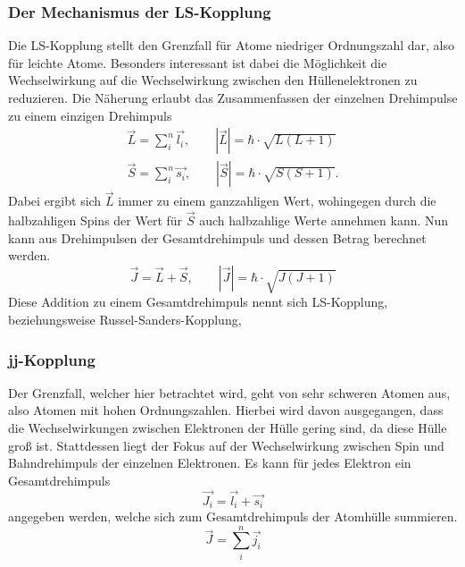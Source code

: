 \subsubsection{Der Mechanismus der LS-Kopplung}
Die LS-Kopplung stellt den Grenzfall für Atome niedriger Ordnungszahl dar, also für leichte Atome. Besonders interessant ist dabei die Möglichkeit die Wechselwirkung auf die Wechselwirkung zwischen den Hüllenelektronen zu reduzieren. Die Näherung erlaubt das Zusammenfassen der einzelnen Drehimpulse zu einem einzigen Drehimpuls
\begin{align}
    \vec{L}=\sum \limits_{i}^n \vec{l_i},\qquad |\vec{L}|=\hbar \cdot \sqrt{L(L+1)}\\
    \vec{S}=\sum \limits_{i}^n \vec{s_i},\qquad |\vec{S}|=\hbar \cdot \sqrt{S(S+1)}.
\end{align}
Dabei ergibt sich $\vec{L}$ immer zu einem ganzzahligen Wert, wohingegen durch die halbzahligen Spins der Wert für $\vec{S}$ auch halbzahlige Werte annehmen kann. Nun kann aus Drehimpulsen der Gesamtdrehimpuls und dessen Betrag 
berechnet werden.
\begin{equation}
    \vec{J}=\vec{L}+\vec{S},\qquad |\vec{J}|=\hbar\cdot\sqrt{J(J+1)}
\end{equation}
Diese Addition zu einem Gesamtdrehimpuls nennt sich LS-Kopplung, beziehungsweise Russel-Sanders-Kopplung,
\subsubsection{jj-Kopplung}
Der Grenzfall, welcher hier betrachtet wird, geht von sehr schweren Atomen aus, also Atomen mit hohen Ordnungszahlen. Hierbei wird davon ausgegangen, dass die Wechselwirkungen zwischen Elektronen der Hülle gering sind, da diese Hülle groß ist. Stattdessen liegt der Fokus auf der Wechselwirkung zwischen Spin und Bahndrehimpuls der einzelnen Elektronen. Es kann für jedes Elektron ein Gesamtdrehimpuls 
\begin{equation}
    \vec{J_i}=\vec{l_i}+\vec{s_i}
\end{equation}
angegeben werden, welche sich zum Gesamtdrehimpuls der Atomhülle summieren.
\begin{equation}
    \vec{J}=\sum \limits_i^n \vec{j_i}
\end{equation}
